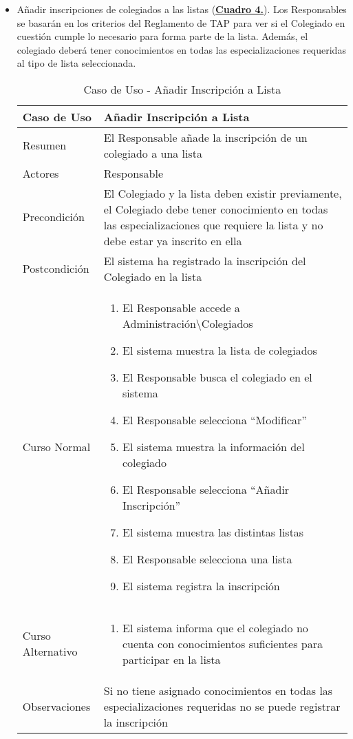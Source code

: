 \begin{itemize}
  \pagebreak
	\item \addtocounter{tabla}{1} Añadir inscripciones de colegiados a las listas (\textbf{\hyperref[tab:curCrearInscrLst]{Cuadro 4.}}). Los Responsables se basarán en los criterios del Reglamento de TAP \cite{reglamentotapcpiia} para ver si el Colegiado en cuestión cumple lo necesario para forma parte de la lista. Además, el colegiado deberá tener conocimientos en todas las especializaciones requeridas al tipo de lista seleccionada.
		\begin{table}[!htbp]
		  \centering  \addtocounter{casouso}{1}
		  \begin{tabular}{|l | p{100mm}|}
		    \textbf{Caso de Uso}  & \textbf{Añadir Inscripción a Lista} \\ \hline
		    Resumen 		 & El Responsable añade la inscripción de un colegiado a una lista \\ \hline
		    Actores  		 & Responsable \\ \hline
		    Precondición  	 & El Colegiado y la lista deben existir previamente, el Colegiado debe tener conocimiento en todas las especializaciones que requiere la lista y no debe estar ya inscrito en ella \\ \hline
		    Postcondición  	 & El sistema ha registrado la inscripción del Colegiado en la lista \\ \hline
		    Curso Normal   	 & \begin{enumerate}
			  \item El Responsable accede a Administración\textbackslash Colegiados
			  \item El sistema muestra la lista de colegiados
			  \item El Responsable busca el colegiado en el sistema
			  \item El Responsable selecciona ``Modificar''
			  \item El sistema muestra la información del colegiado
			  \item El Responsable selecciona ``Añadir Inscripción''
			  \item El sistema muestra las distintas listas
			  \item El Responsable selecciona una lista
			  \item El sistema registra la inscripción
		    \end{enumerate}  \\ \hline
		    Curso Alternativo  & \begin{enumerate}
			  \item El sistema informa que el colegiado no cuenta con conocimientos suficientes para participar en la lista
		    \end{enumerate}  \\ \hline
		    Observaciones 	 & Si no tiene asignado conocimientos en todas las especializaciones requeridas no se puede registrar la inscripción \\ \hline
		  \end{tabular}
		  \caption{Caso de Uso  - Añadir Inscripción a Lista}
		  \label{tab:curCrearInscrLst}
		\end{table}
		\FloatBarrier
		

\end{itemize}
